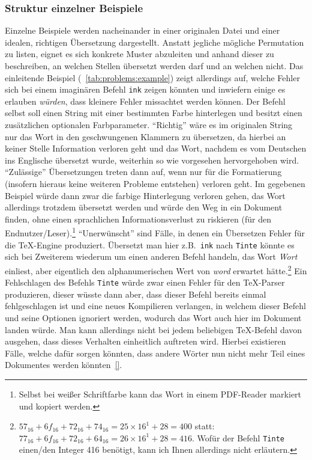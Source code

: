 \subsubsection*{Struktur einzelner Beispiele}\par
Einzelne Beispiele werden nacheinander in einer originalen Datei und einer idealen, richtigen Übersetzung dargestellt.
Anstatt jegliche mögliche Permutation zu listen, eignet es sich konkrete Muster abzuleiten und anhand dieser zu beschreiben, an welchen Stellen übersetzt werden darf und an welchen nicht. 
%
Das einleitende Beispiel (~\ref{tab:problems:example}) zeigt allerdings auf, welche Fehler sich bei einem imaginären Befehl \texttt{ink} zeigen könnten und inwiefern einige es erlauben \textit{würden}, dass kleinere Fehler missachtet werden können. Der Befehl selbst soll einen String mit einer bestimmten Farbe hinterlegen und besitzt einen zusätzlichen optionalen Farbparameter. 
\enquote{Richtig} wäre es im originalen String nur das Wort in den geschwungenen Klammern zu übersetzen, da hierbei an keiner Stelle Information verloren geht und das Wort, nachdem es vom Deutschen ins Englische übersetzt wurde, weiterhin so wie vorgesehen hervorgehoben wird.
\enquote{Zulässige} Übersetzungen treten dann auf, wenn nur für die Formatierung (insofern hieraus keine weiteren Probleme entstehen) verloren geht. Im gegebenen Beispiel würde dann zwar die farbige Hinterlegung verloren gehen, das Wort allerdings trotzdem übersetzt werden und würde den Weg in ein Dokument finden, ohne einen sprachlichen Informationsverlust zu riskieren (für den Endnutzer/Leser).\footnote{Selbst bei weißer Schriftfarbe kann das Wort in einem PDF-Reader markiert und kopiert werden.}
\enquote{Unerwünscht} sind Fälle, in denen ein Übersetzen Fehler für die \TeX{}-Engine produziert. Übersetzt man hier z.B.\ \texttt{ink} nach \texttt{Tinte} könnte es sich bei Zweiterem wiederum um einen anderen Befehl handeln, das Wort \textit{Wort} einliest, aber eigentlich den alphanumerischen Wert von \textit{word} erwartet hätte.\footnote{$57_{16}+6f_{16} + 72_{16} + 74_{16} = 25\times 16^1 + 28 = 400$ statt:\ $77_{16}+6f_{16} + 72_{16} + 64_{16} = 26\times 16^1 + 28 = 416$. Wofür der Befehl \texttt{Tinte} einen/den Integer 416 benötigt, kann ich Ihnen allerdings nicht erläutern.} Ein Fehlschlagen des Befehls \texttt{Tinte} würde zwar einen Fehler für den \TeX{}-Parser produzieren, dieser wüsste dann aber, dass dieser Befehl bereits einmal fehlgeschlagen ist und eine neues Kompilieren verlangen, in welchem dieser Befehl und seine Optionen ignoriert werden, wodurch das Wort auch hier im Dokument landen würde. Man kann allerdings nicht bei jedem beliebigen \TeX{}-Befehl davon ausgehen, dass dieses Verhalten einheitlich auftreten wird. Hierbei existieren Fälle, welche dafür sorgen könnten, dass andere Wörter nun nicht mehr Teil eines Dokumentes werden könnten~\ref{}.%
